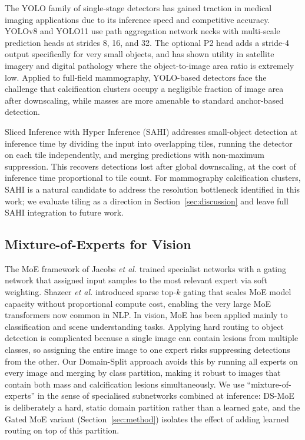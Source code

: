 \documentclass[runningheads]{llncs}
\begin{document}
The YOLO family of single-stage detectors \cite{redmon2016you} has
gained traction in medical imaging applications due to its inference
speed and competitive accuracy. YOLOv8 and YOLO11 \cite{jocher2024ultralytics}
use path aggregation network necks with multi-scale prediction heads at
strides 8, 16, and 32. The optional P2 head adds a stride-4 output
specifically for very small objects, and has shown utility in satellite
imagery and digital pathology where the object-to-image area ratio is
extremely low. Applied to full-field mammography, YOLO-based detectors
face the challenge that calcification clusters occupy a negligible
fraction of image area after downscaling, while masses are more
amenable to standard anchor-based detection.

Sliced Inference with Hyper Inference (SAHI) \cite{akyon2022sahi}
addresses small-object detection at inference time by dividing the
input into overlapping tiles, running the detector on each tile
independently, and merging predictions with non-maximum suppression.
This recovers detections lost after global downscaling, at the cost of
inference time proportional to tile count. For mammography calcification
clusters, SAHI is a natural candidate to address the resolution
bottleneck identified in this work; we evaluate tiling as a direction
in Section~\ref{sec:discussion} and leave full SAHI integration to
future work.

\subsection{Mixture-of-Experts for Vision}

The MoE framework of Jacobs \textit{et al.} \cite{jacobs1991adaptive}
trained specialist networks with a gating network that assigned input
samples to the most relevant expert via soft weighting. Shazeer
\textit{et al.} \cite{shazeer2017outrageously} introduced sparse
top-$k$ gating that scales MoE model capacity without proportional
compute cost, enabling the very large MoE transformers now common in
NLP. In vision, MoE has been applied mainly to classification and scene
understanding tasks. Applying hard routing to object detection is
complicated because a single image can contain lesions from multiple
classes, so assigning the entire image to one expert risks suppressing
detections from the other. Our Domain-Split approach avoids this by
running all experts on every image and merging by class partition,
making it robust to images that contain both mass and calcification
lesions simultaneously. We use ``mixture-of-experts'' in the sense of
specialised subnetworks combined at inference: DS-MoE is deliberately a
hard, static domain partition rather than a learned gate, and the Gated
MoE variant (Section~\ref{sec:method}) isolates the effect of adding
learned routing on top of this partition.
\end{document}
